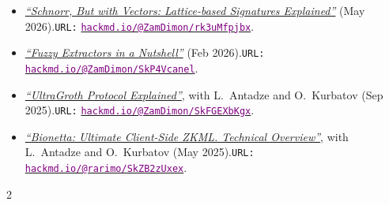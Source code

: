 \documentclass[10pt,a4paper,ragged2e]{maltacv}
\begin{document}
\divider

\begin{itemize}
  \item \href{https://hackmd.io/@ZamDimon/rk3uMfpjbx}{\textit{``Schnorr, But with Vectors: Lattice-based Signatures Explained''}} (May 2026).\newline \texttt{URL:} \href{https://hackmd.io/@ZamDimon/rk3uMfpjbx}{\textcolor{purple}{\texttt{hackmd.io/@ZamDimon/rk3uMfpjbx}}}.
  \item \href{https://hackmd.io/@ZamDimon/SkP4Vcanel}{\textit{``Fuzzy Extractors in a Nutshell''}} (Feb 2026).\newline \texttt{URL:} \href{https://hackmd.io/@ZamDimon/SkP4Vcanel}{\textcolor{purple}{\texttt{hackmd.io/@ZamDimon/SkP4Vcanel}}}.
  \item \href{https://hackmd.io/@ZamDimon/SkFGEXbKgx}{\textit{``UltraGroth Protocol Explained''}}, with L.~Antadze and O.~Kurbatov (Sep 2025).\newline \texttt{URL:} \href{https://hackmd.io/@ZamDimon/SkFGEXbKgx}{\textcolor{purple}{\texttt{hackmd.io/@ZamDimon/SkFGEXbKgx}}}.
  \item \href{https://hackmd.io/@rarimo/SkZB2zUxex}{\textit{``Bionetta: Ultimate Client-Side ZKML. Technical Overview''}}, with L.~Antadze and O.~Kurbatov (May 2025).\newline \texttt{URL:} \href{https://hackmd.io/@rarimo/SkZB2zUxex}{\textcolor{purple}{\texttt{hackmd.io/@rarimo/SkZB2zUxex}}}.
\end{itemize}

\medskip
{}
\medskip

\begin{multicols}{2}
  

  \columnbreak


\end{multicols}
\end{document}
